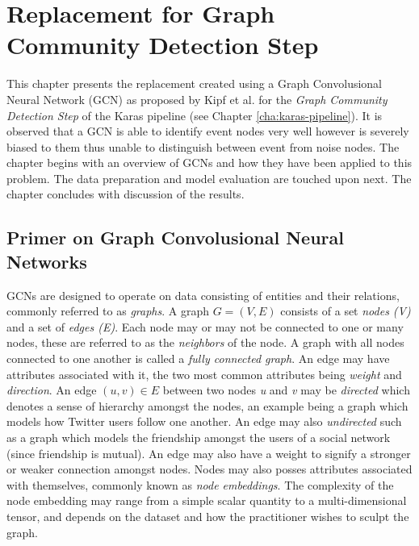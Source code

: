 
\chapter{Replacement for Graph Community Detection Step} %
\label{cha:gcn}
% 

This chapter presents the replacement created using a Graph
Convolusional Neural Network (GCN) as proposed by Kipf et al. for the
\emph{Graph Community Detection Step} of the Karas pipeline (see
Chapter \ref{cha:karas-pipeline}). It is observed that a GCN is able
to identify event nodes very well however is severely biased to them
thus unable to distinguish between event from noise nodes. The chapter
begins with an overview of GCNs and how they have been applied to this
problem. The data preparation and model evaluation are touched upon
next. The chapter concludes with discussion of the results.

\section{Primer on Graph Convolusional Neural Networks}
\label{sec:gcn-primer}

GCNs are designed to operate on data consisting of entities and their
relations, commonly referred to as \emph{graphs}. A graph $G = (V, E)$
consists of a set \emph{nodes (V)} and a set of \emph{edges (E)}. Each
node may or may not be connected to one or many nodes, these are
referred to as the \emph{neighbors} of the node. A graph with all
nodes connected to one another is called a \emph{fully connected
graph}. An edge may have attributes associated with it, the two most
common attributes being \emph{weight} and \emph{direction}. An edge
$(u, v) \in E$ between two nodes \emph{u} and \emph{v} may be
\emph{directed} which denotes a sense of hierarchy amongst the nodes,
an example being a graph which models how Twitter users follow one
another. An edge may also \emph{undirected} such as a graph which
models the friendship amongst the users of a social network (since
friendship is mutual). An edge may also have a weight to signify a
stronger or weaker connection amongst nodes. Nodes may also posses
attributes associated with themselves, commonly known as \emph{node
embeddings}. The complexity of the node embedding may range from a
simple scalar quantity to a multi-dimensional tensor, and depends on
the dataset and how the practitioner wishes to sculpt the graph.

